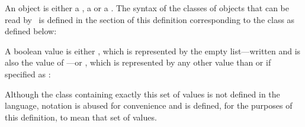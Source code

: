 \label{objects}
\begin{optDefinition}
An object is either a , a  or a .  The
syntax of the classes of objects that can be read by \eulisp\ is defined in the
section of this definition corresponding to the class as defined below:
%
\Syntax
\label{object-syntax}

\label{boolean}
%
A boolean value is either  , which is
represented by the empty list---written \nil{} and is also the value of
---or  , which is represented by
any other value than \nil{} or if specified as \true{}:
%
\Syntax
\label{object-syntax}

Although the class containing exactly this set of values is not defined in the
language, notation is abused for convenience and 
 is defined, for the purposes of this definition, to
mean that set of values.

\end{optDefinition}
